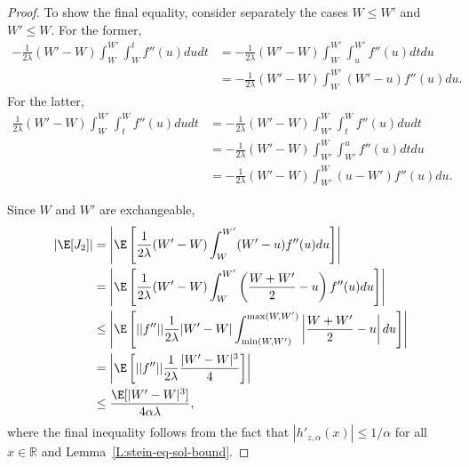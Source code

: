 \begin{proof}
  To show the final equality, consider separately the cases $W \leq W'$ and $W' \leq W$.  For the
  former, 
  \begin{equation*}
    \begin{split}
      -\frac{1}{2 \lambda}(W'-W)\int_{W}^{W'}\int_W^t f''(u) du dt
      &= -\frac{1}{2 \lambda}(W'-W)\int_{W}^{W'}\int_u^{W'} f''(u) dt du \\
      &= -\frac{1}{2 \lambda}(W'-W)\int_{W}^{W'} (W'-u)f''(u) du.
    \end{split}
  \end{equation*}
  For the latter,
  \begin{equation*}
    \begin{split}
      \frac{1}{2 \lambda}(W'-W)\int_{W}^{W'}\int_t^W f''(u) du dt
      &= -\frac{1}{2 \lambda}(W'-W)\int_{W'}^{W}\int_t^{W} f''(u) du dt \\
      &= -\frac{1}{2 \lambda}(W'-W)\int_{W'}^{W}\int_{W'}^{u} f''(u) dt du \\
      &= -\frac{1}{2 \lambda}(W'-W)\int_{W'}^{W}(u-W')f''(u) du.
    \end{split}
  \end{equation*}
  
  Since $W$ and $W'$ are exchangeable,
  \begin{equation}
    \begin{split}
      |\E [J_2]| &= \left | \E \left [ \frac{1}{2 \lambda}(W'-W)\int_W^{W'} (W'-u)f''(u) du 
        \right ] \right | \\
      &= \left | \E \left [ \frac{1}{2 \lambda}(W'-W)\int_W^{W'} \left ( \frac{W+W'}{2}-u \right )
        f''(u) du \right ] \right | \\
    &\leq \left | \E \left [ ||f''|| \frac{1}{2\lambda}|W'-W|\int_{\min(W,W')}^{\max(W,W')} \left | 
          \frac{W+W'}{2} -u \right | du \right ] \right | \\
    &= \left | \E \left [ ||f''|| \frac{1}{2\lambda}\frac{|W'-W|^3}{4}
      \right ] \right | \\
    &\leq \frac{\E [|W'-W|^3]}{4 \alpha \lambda},
    \end{split}
  \end{equation}
  where the final inequality follows from the fact that $|h'_{z,\alpha}(x)|\leq 1/\alpha$ for all $x
  \in \mathbb{R}$ and Lemma~\ref{L:stein-eq-sol-bound}.


\end{proof}
